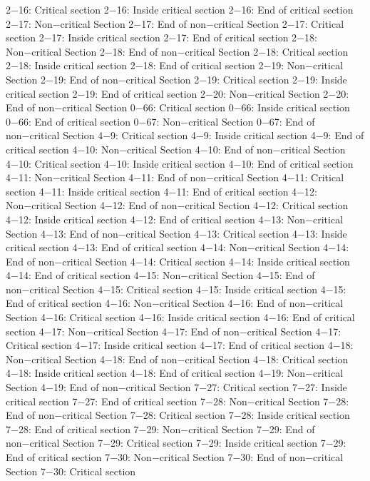 2−16: Critical section
2−16: Inside critical section
2−16: End of critical section
2−17: Non−critical Section
2−17: End of non−critical Section
2−17: Critical section
2−17: Inside critical section
2−17: End of critical section
2−18: Non−critical Section
2−18: End of non−critical Section
2−18: Critical section
2−18: Inside critical section
2−18: End of critical section
2−19: Non−critical Section
2−19: End of non−critical Section
2−19: Critical section
2−19: Inside critical section
2−19: End of critical section
2−20: Non−critical Section
2−20: End of non−critical Section
0−66: Critical section
0−66: Inside critical section
0−66: End of critical section
0−67: Non−critical Section
0−67: End of non−critical Section
4−9: Critical section
4−9: Inside critical section
4−9: End of critical section
4−10: Non−critical Section
4−10: End of non−critical Section
4−10: Critical section
4−10: Inside critical section
4−10: End of critical section
4−11: Non−critical Section
4−11: End of non−critical Section
4−11: Critical section
4−11: Inside critical section
4−11: End of critical section
4−12: Non−critical Section
4−12: End of non−critical Section
4−12: Critical section
4−12: Inside critical section
4−12: End of critical section
4−13: Non−critical Section
4−13: End of non−critical Section
4−13: Critical section
4−13: Inside critical section
4−13: End of critical section
4−14: Non−critical Section
4−14: End of non−critical Section
4−14: Critical section
4−14: Inside critical section
4−14: End of critical section
4−15: Non−critical Section
4−15: End of non−critical Section
4−15: Critical section
4−15: Inside critical section
4−15: End of critical section
4−16: Non−critical Section
4−16: End of non−critical Section
4−16: Critical section
4−16: Inside critical section
4−16: End of critical section
4−17: Non−critical Section
4−17: End of non−critical Section
4−17: Critical section
4−17: Inside critical section
4−17: End of critical section
4−18: Non−critical Section
4−18: End of non−critical Section
4−18: Critical section
4−18: Inside critical section
4−18: End of critical section
4−19: Non−critical Section
4−19: End of non−critical Section
7−27: Critical section
7−27: Inside critical section
7−27: End of critical section
7−28: Non−critical Section
7−28: End of non−critical Section
7−28: Critical section
7−28: Inside critical section
7−28: End of critical section
7−29: Non−critical Section
7−29: End of non−critical Section
7−29: Critical section
7−29: Inside critical section
7−29: End of critical section
7−30: Non−critical Section
7−30: End of non−critical Section
7−30: Critical section
